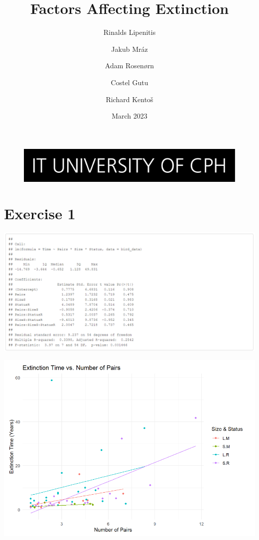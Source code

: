 \documentclass{article}
\begin{document}
\title{Factors Affecting Extinction}

\begin{figure}
    \includegraphics[width=\linewidth]{ITU.jpg}
\end{figure}
\maketitle
\author{Rinalds Lipenitis \and Jakub Mráz \and
Adam Rosenørn \and Costel Gutu \and Richard Kentoš}
\begin{center}
\date{March 2023}
\end{center}

\newpage

\section{Exercise 1}


\includegraphics[scale=0.5]{tables/all-multiplied.png}


\begin{center}
\includegraphics[scale=0.5]{graphs/graph1.png}
\end{center}
\end{document}
